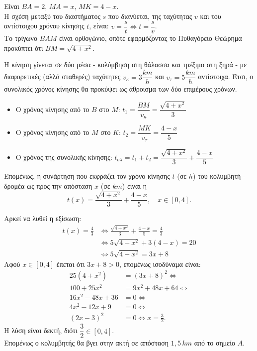 \documentclass[11pt,a4paper,twoside]{book}
\begin{document}
\begin{alist}
\item Είναι $BA = 2$, $MA = x$, $MK = 4-x$. \\
Η σχέση μεταξύ του διαστήματος $s$ που διανύεται, της ταχύτητας $v$ και του αντίστοιχου χρόνου κίνησης $t$, είναι: $v = \dfrac{s}{t} \Leftrightarrow t = \dfrac{s}{v}$. \\
Το τρίγωνο $BAM$ είναι ορθογώνιο, οπότε εφαρμόζοντας το Πυθαγόρειο Θεώρημα προκύπτει ότι $BM = \sqrt{4 + x^2}$.
\item Η κίνηση γίνεται σε δύο μέσα - κολύμβηση στη θάλασσα και τρέξιμο στη ξηρά - με διαφορετικές (αλλά σταθερές) ταχύτητες $v_{\kappa} = 3 \dfrac{km}{h}$ και $v_{\tau} = 5 \dfrac{km}{h}$ αντίστοιχα. Έτσι, ο συνολικός χρόνος κίνησης θα προκύψει ως άθροισμα των δύο επιμέρους χρόνων.
\begin{itemize}
    \item Ο χρόνος κίνησης από το $B$ στο $M$: $t_1 = \dfrac{BM}{v_{\kappa}} = \dfrac{\sqrt{4+x^2}}{3}$
    \item Ο χρόνος κίνησης από το $M$ στο $K$: $t_2 = \dfrac{MK}{v_{\tau}} = \dfrac{4-x}{5}$
    \item Ο χρόνος της συνολικής κίνησης: $t_{o\lambda} = t_1 + t_2 = \dfrac{\sqrt{4+x^2}}{3} + \dfrac{4-x}{5}$
\end{itemize}
Επομένως, η συνάρτηση που εκφράζει τον χρόνο κίνησης $t$ (σε $h$) του κολυμβητή - δρομέα ως προς την απόσταση $x$ (σε $km$) είναι η
\[t(x) = \frac{\sqrt{4+x^2}}{3} + \frac{4-x}{5}, \quad x \in [0, 4].\]
\item Αρκεί να λυθεί η εξίσωση:
\begin{align*}
t(x) = \frac{4}{3} &\Leftrightarrow \frac{\sqrt{4+x^2}}{3} + \frac{4-x}{5} = \frac{4}{3} \\
&\Leftrightarrow 5\sqrt{4+x^2} + 3(4-x) = 20 \\
&\Leftrightarrow 5\sqrt{4+x^2} = 3x + 8
\end{align*}
Αφού $x \in [0,4]$ έπεται ότι $3x + 8 > 0$, επομένως ισοδύναμα είναι:
\begin{align*}
25(4+x^2) &= (3x+8)^2 \Leftrightarrow \\
100 + 25x^2 &= 9x^2 + 48x + 64 \Leftrightarrow \\
16x^2 - 48x + 36 &= 0 \Leftrightarrow \\
4x^2 - 12x + 9 &= 0 \Leftrightarrow \\
(2x - 3)^2 &= 0 \Leftrightarrow x = \frac{3}{2}.
\end{align*}
Η λύση είναι δεκτή, διότι $\dfrac{3}{2} \in [0,4]$. \\
Επομένως ο κολυμβητής θα βγει στην ακτή σε απόσταση $1,5 \, km$ από το σημείο $A$.
\end{alist}
\end{document}
